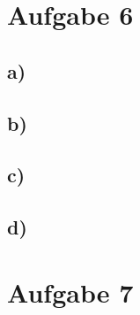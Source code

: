 \documentclass{article}
\begin{document}
\section{Aufgabe 6}
	\subsection{a)}
	\subsection{b)}
	\subsection{c)}
	\subsection{d)}
\section{Aufgabe 7}
\end{document}
